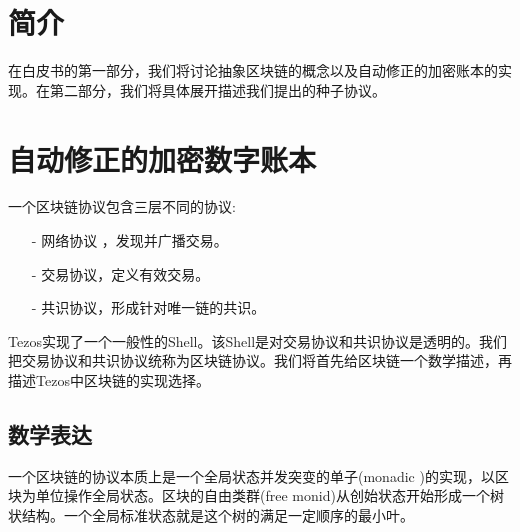 \documentclass[letterpaper]{article}
\begin{document}
\tableofcontents
\newpage

\section{简介}

在白皮书的第一部分，我们将讨论抽象区块链的概念以及自动修正的加密账本的实现。在第二部分，我们将具体展开描述我们提出的种子协议。

\section{自动修正的加密数字账本}

一个区块链协议包含三层不同的协议:
\begin{itemize}
\item[-] 网络协议 ，发现并广播交易。
\item[-] 交易协议，定义有效交易。
\item[-] 共识协议，形成针对唯一链的共识。
\end{itemize}


Tezos实现了一个一般性的Shell。该Shell是对交易协议和共识协议是透明的。我们把交易协议和共识协议统称为区块链协议。我们将首先给区块链一个数学描述，再描述Tezos中区块链的实现选择。

\subsection{数学表达}

一个区块链的协议本质上是一个全局状态并发突变的单子(monadic )的实现，以区块为单位操作全局状态。区块的自由类群(free monid)从创始状态开始形成一个树状结构。一个全局标准状态就是这个树的满足一定顺序的最小叶。
\end{document}
